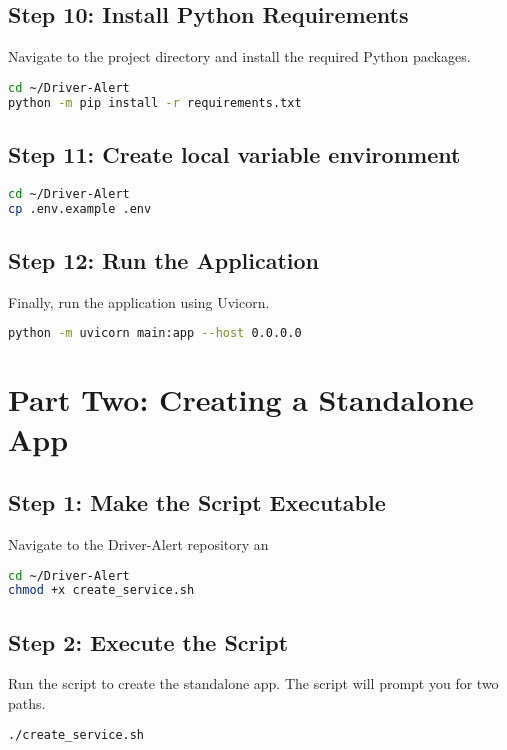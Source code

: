 \documentclass{report}
\begin{document}
\section{Step 10: Install Python Requirements}
Navigate to the project directory and install the required Python packages.

\begin{lstlisting}[language=bash]
cd ~/Driver-Alert
python -m pip install -r requirements.txt
\end{lstlisting}

\section{Step 11: Create local variable environment}

\begin{lstlisting}[language=bash]
cd ~/Driver-Alert
cp .env.example .env
\end{lstlisting}

\section{Step 12: Run the Application}
Finally, run the application using Uvicorn.

\begin{lstlisting}[language=bash]
python -m uvicorn main:app --host 0.0.0.0
\end{lstlisting}

\chapter{Part Two: Creating a Standalone App}

\section{Step 1: Make the Script Executable}
Navigate to the Driver-Alert repository an
\begin{lstlisting}[language=bash]
cd ~/Driver-Alert
chmod +x create_service.sh
\end{lstlisting}

\section{Step 2: Execute the Script}
Run the script to create the standalone app. The script will prompt you for two paths.

\begin{lstlisting}[language=bash]
./create_service.sh
\end{lstlisting}
\end{document}
